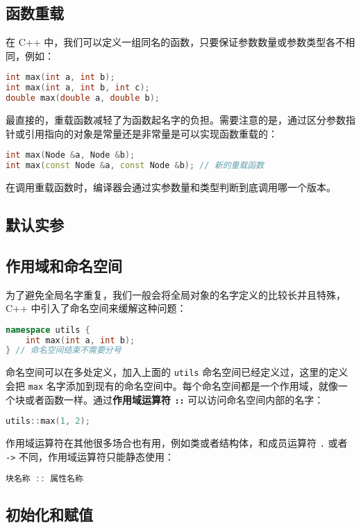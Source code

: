 \documentclass[hyperref,UTF8]{article}
\begin{document}
\subsection{函数重载}

在 C++ 中，我们可以定义一组同名的函数，只要保证参数数量或参数类型各不相同，例如：
\begin{lstlisting}[language=c++]
int max(int a, int b);
int max(int a, int b, int c);
double max(double a, double b);
\end{lstlisting}
最直接的，重载函数减轻了为函数起名字的负担。需要注意的是，通过区分参数指针或引用指向的对象是常量还是非常量是可以实现函数重载的：
\begin{lstlisting}[language=c++]
int max(Node &a, Node &b);
int max(const Node &a, const Node &b); // 新的重载函数
\end{lstlisting}

在调用重载函数时，编译器会通过实参数量和类型判断到底调用哪一个版本。

\subsection{默认实参}

\subsection{作用域和命名空间} \label{sec:scope}

为了避免全局名字重复，我们一般会将全局对象的名字定义的比较长并且特殊，C++ 中引入了命名空间来缓解这种问题：
\begin{lstlisting}[language=c++]
namespace utils {
    int max(int a, int b);
} // 命名空间结束不需要分号
\end{lstlisting}
命名空间可以在多处定义，加入上面的 \texttt{utils} 命名空间已经定义过，这里的定义会把 \texttt{max} 名字添加到现有的命名空间中。每个命名空间都是一个作用域，就像一个块或者函数一样。通过\textbf{作用域运算符 \texttt{::}} 可以访问命名空间内部的名字：
\begin{lstlisting}[language=c++]
utils::max(1, 2);
\end{lstlisting}
作用域运算符在其他很多场合也有用，例如类或者结构体，和成员运算符 \texttt{.} 或者 \texttt{->} 不同，作用域运算符只能静态使用：
\begin{lstlisting}[language=c++,numbers=none]
块名称 :: 属性名称
\end{lstlisting}

\subsection{初始化和赋值}
\end{document}
